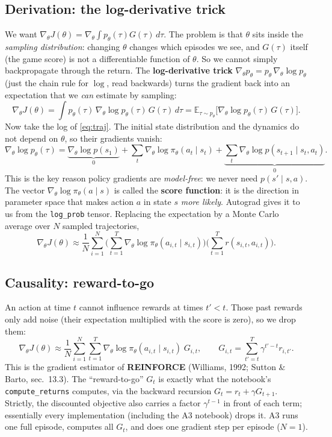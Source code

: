 \documentclass[11pt,a4paper]{article}
\newcommand{\E}{\mathbb{E}}
\newcommand{\pit}{\pi_\theta}
\newcommand{\gradt}{\nabla_\theta}
\newcommand{\code}[1]{\texttt{#1}}
\begin{document}
\subsection{Derivation: the log-derivative trick}
We want $\gradt J(\theta) = \gradt\int p_\theta(\tau)G(\tau)\,d\tau$.
The problem is that $\theta$ sits inside the \emph{sampling distribution}: changing $\theta$ changes which episodes we see, and $G(\tau)$ itself (the game score) is not a differentiable function of $\theta$. So we cannot simply backpropagate through the return.
The \textbf{log-derivative trick} $\gradt p_\theta = p_\theta\,\gradt\log p_\theta$ (just the chain rule for $\log$, read backwards) turns the gradient back into an expectation that we \emph{can} estimate by sampling:
\begin{equation}
  \gradt J(\theta) = \int p_\theta(\tau)\,\gradt\log p_\theta(\tau)\,G(\tau)\,d\tau
  = \E_{\tau\sim p_\theta}\big[\gradt \log p_\theta(\tau)\,G(\tau)\big].
\end{equation}
Now take the log of \eqref{eq:traj}. The initial state distribution and the dynamics do not depend on $\theta$, so their gradients vanish:
\begin{equation}
  \gradt\log p_\theta(\tau) = \underbrace{\gradt\log p(s_1)}_{0} + \sum_{t}\gradt\log\pit(a_t\mid s_t) + \underbrace{\sum_t\gradt\log p(s_{t+1}\mid s_t,a_t)}_{0}.
\end{equation}
This is the key reason policy gradients are \emph{model-free}: we never need $p(s'\mid s,a)$.
The vector $\gradt\log\pit(a\mid s)$ is called the \textbf{score function}: it is the direction in parameter space that makes action $a$ in state $s$ \emph{more likely}. Autograd gives it to us from the \code{log\_prob} tensor.
Replacing the expectation by a Monte Carlo average over $N$ sampled trajectories,
\begin{equation}
  \gradt J(\theta) \approx \frac1N\sum_{i=1}^N\Big(\sum_{t=1}^T\gradt\log\pit(a_{i,t}\mid s_{i,t})\Big)\Big(\sum_{t=1}^T r(s_{i,t},a_{i,t})\Big).
  \label{eq:pg-full}
\end{equation}

\subsection{Causality: reward-to-go}
An action at time $t$ cannot influence rewards at times $t'<t$. Those past rewards only add noise (their expectation multiplied with the score is zero), so we drop them:
\begin{equation}
  \gradt J(\theta) \approx \frac1N\sum_{i=1}^N\sum_{t=1}^T\gradt\log\pit(a_{i,t}\mid s_{i,t})\;G_{i,t},
  \qquad G_{i,t}=\sum_{t'=t}^{T}\gamma^{t'-t}r_{i,t'}.
  \label{eq:reinforce}
\end{equation}
This is the gradient estimator of \textbf{REINFORCE} (Williams, 1992; Sutton \& Barto, sec.~13.3). The \enquote{reward-to-go} $G_t$ is exactly what the notebook's \code{compute\_returns} computes, via the backward recursion $G_t=r_t+\gamma G_{t+1}$.
Strictly, the discounted objective also carries a factor $\gamma^{t-1}$ in front of each term; essentially every implementation (including the A3 notebook) drops it.
A3 runs one full episode, computes all $G_t$, and does one gradient step per episode ($N=1$).
\end{document}
